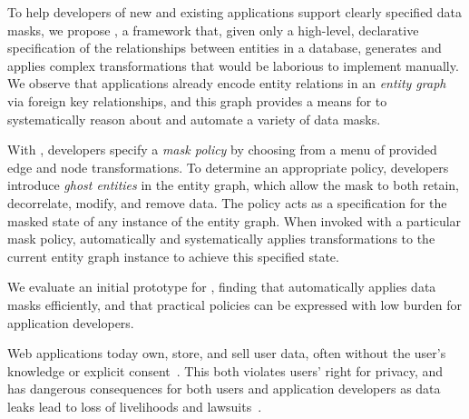 To help developers of new and existing applications support clearly specified data masks, we propose
\sys, a framework that, given only a high-level, declarative specification of the relationships
between entities in a database, generates and applies complex transformations that would be
laborious to implement manually. We observe that applications already encode entity
relations in an \emph{entity graph} via foreign key relationships, and this graph provides a means
for \sys to systematically reason about and automate a variety of data masks.

With \sys, developers specify a \emph{mask policy} by choosing from a menu of provided edge and node
transformations. To determine an appropriate policy, developers introduce \emph{ghost entities} in the entity graph, which allow the mask to both retain, decorrelate, modify,
and remove data. The policy acts as a specification for the masked state of any instance of the
entity graph. When invoked with a particular mask policy, \sys automatically and systematically
applies transformations to the current entity graph instance to achieve this specified state.

We evaluate an initial prototype for \sys, finding that \sys automatically applies
data masks efficiently, and that practical policies can be expressed with low burden for application
developers.
\fi

\iffalse
%
%
Web applications today own, store, and sell user data, often without the user's knowledge or
explicit consent~\cite{nytimes:fb, npr:data}. This both violates users' right for privacy, and has
dangerous consequences for both users and application developers as data leaks lead to loss of
livelihoods and lawsuits~\cite{breach:amazon,breach:twitter, breach:fb, breach:marriott,
breach:quora}.

